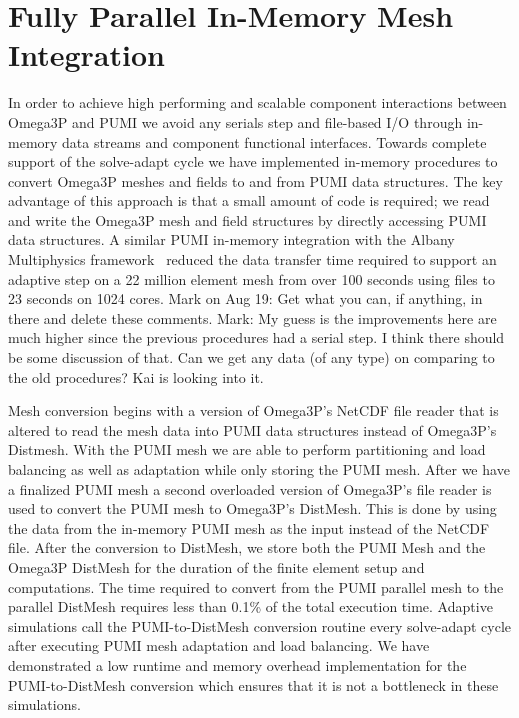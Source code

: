 \documentclass[review,12pt]{elsarticle_summary_report}
\begin{document}
\section{\label{in_memory}Fully Parallel In-Memory Mesh Integration}
In order to achieve high performing and scalable component interactions between
Omega3P and PUMI we avoid any serials step and 
file-based I/O through in-memory data streams and component functional
interfaces. Towards complete support of the solve-adapt cycle we have implemented in-memory
procedures to convert Omega3P meshes and fields to and from  PUMI data structures.
The key advantage of this approach is that a small amount of code is 
required; we read and write the Omega3P mesh and field
structures by directly accessing PUMI data structures.
A similar PUMI in-memory integration with the Albany Multiphysics
framework~\cite{Albany2015,salinger2013albany} reduced the data transfer time
required to support an adaptive step on a 22 million element mesh from over 100
seconds using files to 23 seconds on 1024 cores. \color{blue} Mark on Aug 19: Get what you can, if anything, in there and delete these comments. Mark: My guess is the improvements here are much higher since the previous procedures had a serial step. I think there should be some discussion of that. Can we get any data (of any type) on comparing to the old procedures? \color{red} Kai is looking into it.\color{black} 

Mesh conversion begins with a version of Omega3P's NetCDF file reader that is altered
to read the mesh data into PUMI data structures instead of Omega3P's Distmesh. With 
the PUMI mesh we are able to perform partitioning and load balancing as well as adaptation 
while only storing the PUMI mesh. After we have a finalized PUMI mesh a second 
overloaded version of Omega3P's file reader is used to convert the PUMI mesh to 
Omega3P's DistMesh. This is done by using the data from the in-memory PUMI mesh as the 
input instead of the NetCDF file. After the conversion to DistMesh, we store both the
PUMI Mesh and the Omega3P DistMesh for the duration of the finite element setup and 
computations. The time required to convert from the PUMI parallel mesh to the
parallel DistMesh requires less than 0.1\% of the total execution time.
Adaptive simulations call the PUMI-to-DistMesh conversion routine every
solve-adapt cycle after executing PUMI mesh adaptation and load balancing.
We have demonstrated a low runtime and memory overhead implementation for the
PUMI-to-DistMesh conversion which ensures that it is not a bottleneck
in these simulations.
\end{document}
